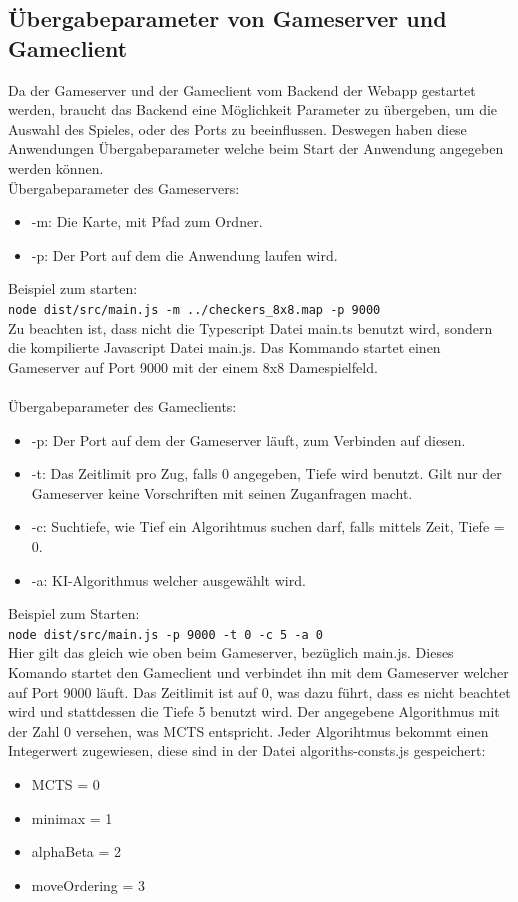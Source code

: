 \documentclass[12pt,a4paper,bibliography=totocnumbered,listof=totocnumbered]{article}
\begin{document}
\begin{appendix}
\section{Übergabeparameter von Gameserver und Gameclient}
\label{apx:Parameters}
Da der Gameserver und der Gameclient vom Backend der Webapp gestartet werden, braucht das Backend eine Möglichkeit Parameter zu übergeben, 
um die Auswahl des Spieles, oder des Ports zu beeinflussen. Deswegen haben diese Anwendungen Übergabeparameter welche beim Start der
Anwendung angegeben werden können. 
\\
Übergabeparameter des Gameservers:
\\
\begin{itemize}
    \item -m: Die Karte, mit Pfad zum Ordner.
    \item -p: Der Port auf dem die Anwendung laufen wird.
\end{itemize}
Beispiel zum starten:\\
\texttt{node dist/src/main.js -m ../checkers\_8x8.map -p 9000}\\
Zu beachten ist, dass nicht die Typescript Datei main.ts benutzt wird, sondern die kompilierte Javascript Datei main.js.
Das Kommando startet einen Gameserver auf Port 9000 mit der einem 8x8 Damespielfeld.
\\
\\
Übergabeparameter des Gameclients:
\\
\begin{itemize}
    \item -p: Der Port auf dem der Gameserver läuft, zum Verbinden auf diesen.
    \item -t: Das Zeitlimit pro Zug, falls 0 angegeben, Tiefe wird benutzt. Gilt nur der Gameserver keine Vorschriften mit seinen Zuganfragen macht.
    \item -c: Suchtiefe, wie Tief ein Algorihtmus suchen darf, falls mittels Zeit, Tiefe = 0.
    \item -a: KI-Algorithmus welcher ausgewählt wird.
\end{itemize}
Beispiel zum Starten:\\
\texttt{node dist/src/main.js -p 9000 -t 0 -c 5 -a 0} \\
Hier gilt das gleich wie oben beim Gameserver, bezüglich main.js. 
Dieses Komando startet den Gameclient und verbindet ihn mit dem Gameserver welcher auf Port 9000 läuft. Das Zeitlimit ist auf 0, was dazu führt, dass es nicht beachtet wird
und stattdessen die Tiefe 5 benutzt wird. Der angegebene Algorithmus mit der Zahl 0 versehen, was MCTS entspricht.
Jeder Algorihtmus bekommt einen Integerwert zugewiesen, diese sind in der Datei algoriths-consts.js gespeichert: \\
\begin{itemize}
    \item MCTS = 0
    \item minimax = 1
    \item alphaBeta = 2
    \item moveOrdering = 3
\end{itemize}


\end{appendix}
\end{document}
